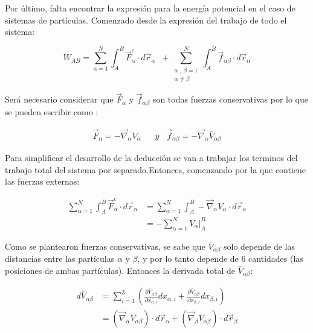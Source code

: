 \documentclass[/home/hernan-barquero/Documents/Apuntes_mecanica_teorica/main.tex]{subfiles}
\begin{document}
	Por último, falta encontrar la expresión para la energía potencial en el caso de sistemas de partículas. Comenzado desde la expresión del trabajo de todo el sistema:

	\begin{equation*}
		W_{AB} = \sum_{\alpha = 1}^{N} \int_{A}^{B} \vec{F}_{\alpha}^{e} \cdot d\vec{r}_{\alpha} \; \; + \sum_{\left . \begin{matrix} \alpha \: , \: \beta = 1\\ \alpha \neq \beta \end{matrix} \right .}^{N} \int_{A}^{B} \vec{f}_{\alpha \beta} \cdot d\vec{r}_{\alpha}
	\end{equation*}

	Será necesario considerar que $\vec{F}_{\alpha}$ y $\vec{f}_{\alpha \beta}$ son todas fuerzas conservativas por lo que se pueden escribir como :

	\begin{align*}
		\vec{F}_{\alpha} = -\vec{\nabla}_{\alpha} V_{\alpha} \; \; \; & y \; \; \; \vec{f}_{\alpha \beta} = -\vec{\nabla}_{\alpha} \bar{V}_{\alpha \beta}
	\end{align*}

	Para simplificar el desarrollo de la deducción se van a trabajar los terminos del trabajo total del sistema por separado.Entonces, comenzando por la que contiene las fuerzas externas:

	\begin{align*}
		\sum_{\alpha = 1}^{N} \int_{A}^{B} \vec{F}_{\alpha}^{e} \cdot d\vec{r}_{\alpha} & = \sum_{\alpha = 1}^{N} \int_{A}^{B} -\vec{\nabla}_{\alpha} V_{\alpha} \cdot d\vec{r}_{\alpha} \\ 
		& = - \sum_{\alpha = 1}^{N} \left .V_{\alpha} \right|_{A}^{B}
	\end{align*}

	Como se plantearon fuerzas conservativas, se sabe que $\bar{V}_{\alpha \beta}$ solo depende de las distancias entre las partículas $\alpha$ y $\beta$, y por lo tanto depende de 6 cantidades (las posiciones de ambas partículas). Entonces la derivada total de  $\bar{V}_{\alpha \beta}$: 

	\begin{align*}
		d\bar{V}_{\alpha \beta} & = \sum_{i=1}^{3} \left(\frac{\partial \bar{V}_{\alpha \beta}}{\partial x_{\alpha,i}} dx_{\alpha,i} + \frac{\partial \bar{V}_{\alpha \beta}}{\partial x_{\beta,i}}dx_{\beta,i}\right) \\ 
		& = \left(\vec{\nabla}_{\alpha} \bar{V}_{\alpha \beta} \right) \cdot d\vec{r}_{\alpha} +\left(\vec{\nabla}_{\beta} \bar{V}_{\alpha \beta} \right) \cdot d\vec{r}_{\beta}
	\end{align*}
\end{document}
